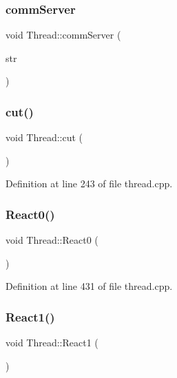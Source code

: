 \subsubsection{\texorpdfstring{comm\+Server}{commServer}}
{\footnotesize\ttfamily void Thread\+::comm\+Server (\begin{DoxyParamCaption}\item[{Q\+String}]{str }\end{DoxyParamCaption})\hspace{0.3cm}{\ttfamily [signal]}}

\mbox{\label{class_thread_a01a6a634b4b993bf5ee53ccba4ad951d}} 
\subsubsection{\texorpdfstring{cut()}{cut()}}
{\footnotesize\ttfamily void Thread\+::cut (\begin{DoxyParamCaption}{ }\end{DoxyParamCaption})}



Definition at line 243 of file thread.\+cpp.

\mbox{\label{class_thread_ae7901935e36a5fec4dba4db73fd00cbe}} 
\subsubsection{\texorpdfstring{React0()}{React0()}}
{\footnotesize\ttfamily void Thread\+::\+React0 (\begin{DoxyParamCaption}{ }\end{DoxyParamCaption})\hspace{0.3cm}{\ttfamily [private]}}



Definition at line 431 of file thread.\+cpp.

\mbox{\label{class_thread_a1f4fe3b88fc87bab5246ebea0167413b}} 
\subsubsection{\texorpdfstring{React1()}{React1()}}
{\footnotesize\ttfamily void Thread\+::\+React1 (\begin{DoxyParamCaption}{ }\end{DoxyParamCaption})\hspace{0.3cm}{\ttfamily [private]}}



